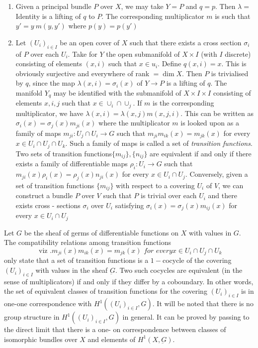 \begin{enumerate}[1)]
\item Given a principal bundle $P$ over $X$, we may take $Y = P$ and
  $q = p$. Then $\lambda = $Identity is a lifting of $q$ to $P$. The
  corresponding multiplicator $m$ is such that $y' = y ~m (y, y')$
  where $p(y) = p (y')$ 
\item Let $(U_i)_{ i \in I}$ be an open cover of $X$ such that there
  exists a cross section $\sigma _i $ of $P$ over each $U_i$. Take for
  $Y$ the open submanifold of $X \times I$ (with $I$ discrete)
  consisting of elements $(x, i)$ such that $x \in
  u_i$. Define $q (x , i) = x $. This is obviously surjective and
  everywhere of rank $= \dim X$. Then $P$  is trivialised by $q$, since
  the map $\lambda (x, i) = \sigma_i (x)$ of $Y \to P$  is a lifting
  of $q$. The manifold $Y_q$ may be identified with the submanifold
  of $X \times I \times I$ consisting of elements $x, i, j$ such that
  $x \in \cup_i \cap \cup_j$. If $m$ is the corresponding
  multiplicator, we have $\lambda 
  (x, i ) = \lambda (x, j ) m (x, j, i )$. This can be written as
  $\sigma_i (x)  = \sigma _j (x) m_{ji}(x)$ where the multiplicator
  $m$ is looked upon as a family of maps $m_{ji} : U_j \cap U_i \to G$
  such that $m_{ji} m_{ik}(x) = m_{jk}(x)$ for every $x \in U_i \cap
  U_j \cap U_k$. Such a family of maps is called a set of \textit{
    transition functions}. Two sets of transition functions\pageoriginale $\{
  m_{ij}\}, \{ n_{ij}\}$  are equivalent if and only if there exists a
  family of differentiable maps $\rho _i : U_i \to G$ such that
  $m_{ji}(x) \rho_i (x)  = \rho_j (x) n_{ji} (x)$ for every $x \in U_i \cap
  U_j$. Conversely, given a set of transition functions $\{m_{ij}\}$
  with respect to a covering $U_i$ of $V$, we can construct a bundle
  $P$ over $V$ such that $P$ is trivial over each $U_i$ and there
  exists cross - sections $\sigma _i$ over $U_i$ satisfying $\sigma _i
  (x) =\sigma _j (x) m_{ij} (x)$ for every $x \in U_i \cap U_j$ 
\end{enumerate} 

Let ${G}$ be the sheaf of germs of differentiable functions
on $X$ with values in $G$. The compatibility relations among transition
functions 
$$
\text{ viz }. m_{ji} (x) m _{ik} (x) = m _{j k }(x) \textit{ for every
} x \in U_i \cap U_j \cap U_k  
$$
only state that a set of transition functions is a $1-$cocycle of the
covering $( U_i) _{ i \in I}$ with values in the sheaf
$\underbar{G}$. Two such cocycles are equivalent (in the sense of
multiplicators) if and only if they differ by a coboundary. In other
words, the set of equivalent classes of transition functions for the
covering $(U_{i})_{ i \in I}$ is in one-one correspondence with
$H^1(( U_i) _{ i \in I}, G)$. It will be noted that there is no group
structure in $H^1 (( U_i)_{i \in I}, G)$ in general. It can be proved
by passing to the direct limit that there is a one- on correspondence
between classes of isomorphic bundles over $X$ and elements of $H^1
(X, \underbar{G})$.  

